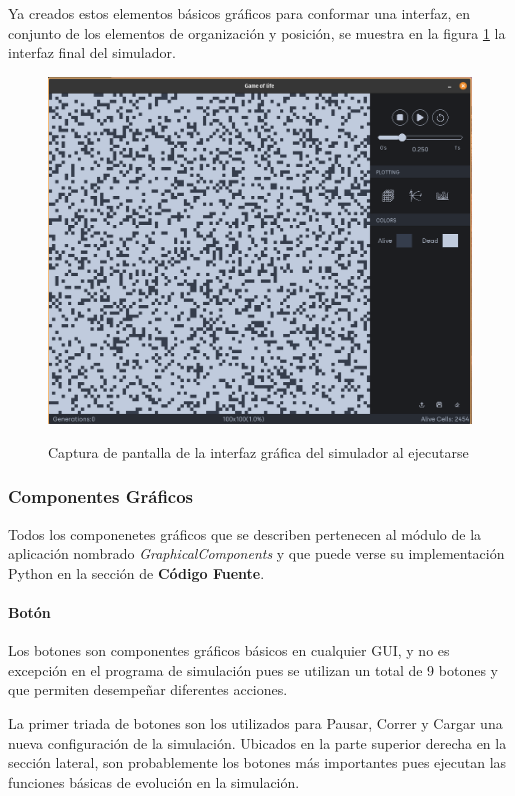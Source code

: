 \documentclass[]{article}
\begin{document}
		Ya creados estos elementos básicos gráficos para conformar una interfaz, en conjunto de los elementos de organización y posición, se muestra en la figura \ref{Interfaz} la interfaz final del simulador.
		
		\begin{figure}[!h]
			\centering
			\includegraphics[width=15cm]{Imagenes/Interfaz.png}
			\label{Interfaz}
			\caption{Captura de pantalla de la interfaz gráfica del simulador al ejecutarse}
		\end{figure}
	
		\subsubsection{Componentes Gráficos}
			Todos los componenetes gráficos que se describen pertenecen al módulo de la aplicación nombrado \textit{GraphicalComponents} y que puede verse su implementación Python en la sección de \textbf{Código Fuente}.
			
			\paragraph{Botón}
				Los botones son componentes gráficos básicos en cualquier GUI, y no es excepción en el programa de simulación pues se utilizan un total de 9 botones y que permiten desempeñar diferentes acciones.
				
				\hfill \break
				La primer triada de botones son los utilizados para Pausar, Correr y Cargar una nueva configuración de la simulación. Ubicados en la parte superior derecha en la sección lateral, son probablemente los botones más importantes pues ejecutan las funciones básicas de evolución en la simulación.
				
\end{document}
